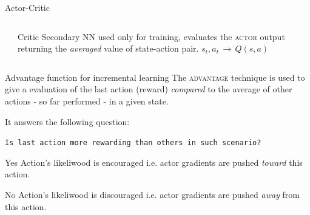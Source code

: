 \documentclass[aspectratio=169]{beamer}
\begin{document}
\begin{frame}{Actor-Critic}
\begin{columns}[T]
\begin{column}{0.1\textwidth}
		\end{column}
		\begin{column}{0.7\textwidth}
			\begin{alertblock}{Critic}
Secondary \textsc{NN} used only for training, evaluates the \textsc{actor} output returning the \textit{averaged} value of state-action pair. $s_t, a_t\,\rightarrow\, Q(s, a)$							\end{alertblock}
		\end{column}
	\end{columns}
	
\end{frame}

\begin{frame}{Advantage function for incremental learning}
	The \textsc{advantage} technique is used to give a  evaluation of the last action (reward) \textit{compared} to the average of other actions - so far performed - in a given state.
\pause

It answers the following question:	

	\centering
	\texttt{Is last action more rewarding than others in such scenario?}
\pause
	\begin{alertblock}{Yes}
		Action's likeliwood is encouraged i.e. actor gradients are pushed \textit{toward} this action.
	\end{alertblock}
	\begin{alertblock}{No}
		Action's likeliwood is discouraged i.e. actor gradients are pushed \textit{away} from this action. 
	\end{alertblock}
\end{frame}
\end{document}
